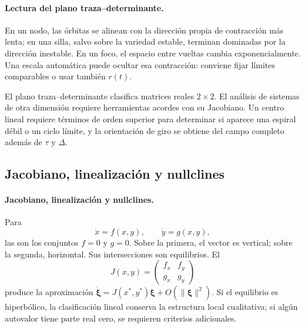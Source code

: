 \paragraph{Lectura del plano traza--determinante.}
En un nodo, las órbitas se alinean con la dirección propia de contracción más lenta;
en una silla, salvo sobre la variedad estable, terminan dominadas por la dirección
inestable. En un foco, el espacio entre vueltas cambia exponencialmente. Una escala
automática puede ocultar esa contracción: conviene fijar límites comparables o usar
también \(r(t)\).

\begin{warningbox}
El plano traza--determinante clasifica matrices reales \(2\times2\). El análisis de
sistemas de otra dimensión requiere herramientas acordes con su Jacobiano. Un centro
lineal requiere términos de orden superior para determinar si aparece una espiral débil
o un ciclo límite, y la orientación de giro se obtiene del campo completo además de
\(\tau\) y \(\Delta\).
\end{warningbox}


\subsection{Jacobiano, linealización y nullclines}

\paragraph{Jacobiano, linealización y nullclines.}
Para
\[
 \dot x=f(x,y),\qquad \dot y=g(x,y),
\]
las  son los conjuntos \(f=0\) y \(g=0\). Sobre la primera, el
vector es vertical; sobre la segunda, horizontal. Sus intersecciones son equilibrios.
El 
\[
 J(x,y)=
 \begin{pmatrix}
 f_x&f_y\\g_x&g_y
 \end{pmatrix}
\]
produce la aproximación
\(\dot{\boldsymbol\xi}=J(x^*,y^*)\boldsymbol\xi+O(\|\boldsymbol\xi\|^2)\).
Si el equilibrio es hiperbólico, la clasificación lineal conserva la estructura
local cualitativa; si algún autovalor tiene parte real cero, se requieren criterios adicionales.

